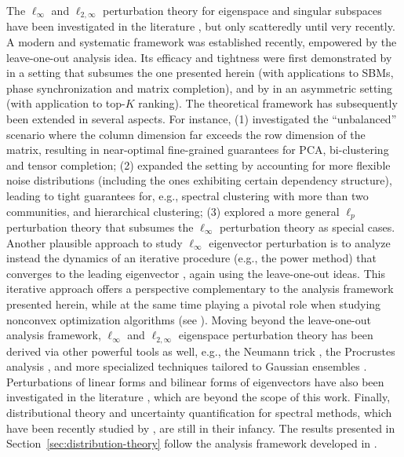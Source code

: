 The $\ell_{\infty}$ and $\ell_{2,\infty}$ perturbation theory for eigenspace and singular subspaces have been investigated in the literature \citep{fan2016ell,cape2019two,eldridge2018unperturbed}, but only scatteredly until very recently.
A modern and systematic framework was established recently,  empowered by the leave-one-out analysis idea.
Its efficacy and tightness  were first demonstrated by \citet{abbe2020entrywise} in a setting that subsumes the one presented herein (with applications to SBMs, phase synchronization and matrix completion), and  by \citet{chen2017spectral} in an asymmetric setting (with application to
 top-$K$ ranking).
 The theoretical framework has subsequently been extended in several aspects.
 For instance, (1) \citet{cai2019subspace} investigated the ``unbalanced'' scenario where the column dimension far exceeds the row dimension of the matrix, resulting in near-optimal fine-grained guarantees for PCA, bi-clustering and tensor completion; (2) \citet{lei2019unified}  expanded the setting by accounting for more flexible noise distributions (including the ones exhibiting certain dependency structure), leading to tight guarantees for, e.g., spectral clustering with more than two communities, and  hierarchical clustering;  (3)  \citet{abbe2020ell_p} explored a more general $\ell_{p}$ perturbation theory that subsumes the $\ell_{\infty}$ perturbation theory as special cases.
Another plausible  approach to study $\ell_{\infty}$ eigenvector perturbation
is to analyze instead the dynamics of an iterative procedure (e.g., the power method) that converges to the leading eigenvector \citep{zhong2017near}, again using the leave-one-out ideas.
This iterative approach offers a perspective complementary to the analysis framework presented herein,
while at the same time playing a pivotal role when studying nonconvex optimization algorithms (see \citet{chi2019nonconvex}).
Moving beyond the leave-one-out analysis framework, $\ell_{\infty}$ and $\ell_{2,\infty}$ eigenspace perturbation theory has been derived via other powerful tools as well, e.g., the Neumann trick \citep{eldridge2018unperturbed,chen2018asymmetry,cheng2020tackling,}, the Procrustes analysis \citep{cape2019two}, and more specialized techniques tailored to Gaussian ensembles \citep{koltchinskii2016perturbation,koltchinskii2016asymptotics,koltchinskii2020efficient}. Perturbations of linear forms and bilinear forms of eigenvectors have also been investigated  in the literature
\citep{koltchinskii2016perturbation,koltchinskii2016asymptotics,chen2018asymmetry,cheng2020tackling,fan2020asymptotic,koltchinskii2020efficient},
which are beyond the scope of this work.
Finally, distributional theory and uncertainty quantification for spectral methods, which
have been recently studied by \citet{xia2019normal, cheng2020tackling, fan2020asymptotic, yan2021inference,agterberg2021entrywise}, 
are still in their infancy. The results presented in Section~\ref{sec:distribution-theory} follow the analysis framework developed in \citet{yan2021inference}. 


